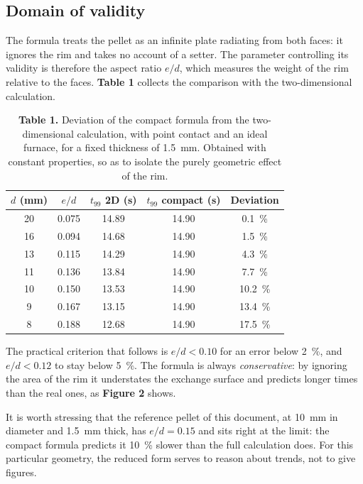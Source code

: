 \documentclass[11pt,a4paper]{article}
\newcommand{\fig}[1]{\textbf{\textcolor{uji}{Figure #1}}}
\newcommand{\tab}[1]{\textbf{\textcolor{uji}{Table #1}}}
\begin{document}
\subsection{Domain of validity}

The formula treats the pellet as an infinite plate radiating from both
faces: it ignores the rim and takes no account of a setter. The parameter
controlling its validity is therefore the aspect ratio $e/d$, which
measures the weight of the rim relative to the faces. \tab{1} collects the
comparison with the two-dimensional calculation.

\begin{table}[htbp]
\centering
\caption*{\textcolor{uji}{\textbf{Table 1.}} Deviation of the compact
formula from the two-dimensional calculation, with point contact and an
ideal furnace, for a fixed thickness of \SI{1.5}{\milli\meter}. Obtained
with constant properties, so as to isolate the purely geometric effect of
the rim.}
\begin{tabular}{ccccc}
\toprule
$d$ (\si{\milli\meter}) & $e/d$ & $t_{99}$ 2D (\si{\second})
& $t_{99}$ compact (\si{\second}) & Deviation \\
\midrule
\num{20} & \num{0.075} & \num{14.89} & \num{14.90} & \SI{0.1}{\percent} \\
\num{16} & \num{0.094} & \num{14.68} & \num{14.90} & \SI{1.5}{\percent} \\
\num{13} & \num{0.115} & \num{14.29} & \num{14.90} & \SI{4.3}{\percent} \\
\num{11} & \num{0.136} & \num{13.84} & \num{14.90} & \SI{7.7}{\percent} \\
\num{10} & \num{0.150} & \num{13.53} & \num{14.90} & \SI{10.2}{\percent} \\
\num{9}  & \num{0.167} & \num{13.15} & \num{14.90} & \SI{13.4}{\percent} \\
\num{8}  & \num{0.188} & \num{12.68} & \num{14.90} & \SI{17.5}{\percent} \\
\bottomrule
\end{tabular}
\end{table}

The practical criterion that follows is $e/d < \num{0.10}$ for an error
below \SI{2}{\percent}, and $e/d < \num{0.12}$ to stay below
\SI{5}{\percent}. The formula is always \emph{conservative}: by ignoring
the area of the rim it understates the exchange surface and predicts longer
times than the real ones, as \fig{2} shows.

It is worth stressing that the reference pellet of this document, at
\SI{10}{\milli\meter} in diameter and \SI{1.5}{\milli\meter} thick, has
$e/d = \num{0.15}$ and sits right at the limit: the compact formula
predicts it \SI{10}{\percent} slower than the full calculation does. For
this particular geometry, the reduced form serves to reason about trends,
not to give figures.
\end{document}
